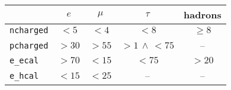 \begin{tabular}{lcccc}
	\toprule
	 & $e$ & $\mu$ & $\tau$ & hadrons \\
	 \midrule
	\texttt{ncharged} & $< 5$  & $< 4$  & $< 8$ & $\geq 8$ \\
	\texttt{pcharged} & $> 30$ & $> 55$ & $>1\,\land\,<75$ & --\\
	\texttt{e\_ecal}  & $> 70$ & $< 15$  & $< 75$ & $> 20$ \\
	\texttt{e\_hcal}  & $< 15$  & $< 25$ & -- & -- \\
	\bottomrule
\end{tabular}